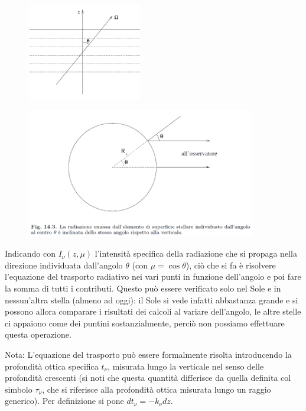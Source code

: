 \begin{minipage}{0.3\textwidth}
    \begin{figure}[H]
        \centering
        \includegraphics[width=5cm]{strati piani.png}
    \end{figure}
\end{minipage}
\begin{minipage}{0.7\textwidth}
    \begin{figure}[H]
        \centering
        \includegraphics[width=10cm]{immagini/angolo_atmosfera_stellare.png}
    \end{figure}
\end{minipage}

\vspace{0.2cm}Indicando con $I_{\nu}(z, \mu)$ l'intensità specifica della radiazione che si propaga
nella direzione individuata dall'angolo $\theta$ (con $\mu= \cos\theta$), ciò che si fa è risolvere l'equazione del trasporto radiativo nei vari punti in funzione dell'angolo e poi fare la somma di tutti i contributi. Questo può essere verificato solo nel Sole e in nessun'altra stella (almeno ad oggi): il Sole si vede infatti abbastanza grande e si possono allora comparare i risultati dei calcoli al variare dell'angolo, le altre stelle ci appaiono come dei puntini sostanzialmente, perciò non possiamo effettuare questa operazione.

\vspace{0.2cm}Nota: L'equazione del trasporto può essere formalmente risolta introducendo la profondità ottica specifica $t_\nu$, misurata lungo la verticale nel senso delle profondità
crescenti (si noti che questa quantità differisce da quella definita col simbolo $\tau_\nu$, che si riferisce alla profondità ottica misurata lungo un raggio generico). Per definizione si pone $dt_{\nu}=-k_{\nu}dz$.

